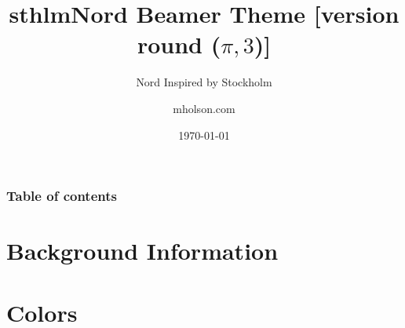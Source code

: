 \documentclass[aspectratio=169, sectionpages, codehl, bibref]{beamer}
\title{sthlmNord Beamer Theme [version round (\(\pi, 3\))]}
\subtitle{Nord Inspired by Stockholm}
\author{mholson.com}
\institute{School in Stockholm}
\date{\today}
\begin{document}
\titlepage


\begin{frame}
	\frametitle{Table of contents}
	\tableofcontents
\end{frame}

\section{Background Information}









\section{Colors}





\end{document}
